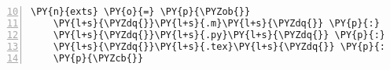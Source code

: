 \begin{Verbatim}[commandchars=\\\{\},numbers=left,numbersep=0.5em,firstnumber=10]
  \PY{n}{exts} \PY{o}{=} \PY{p}{\PYZob{}}
    \PY{l+s}{\PYZdq{}}\PY{l+s}{.m}\PY{l+s}{\PYZdq{}} \PY{p}{:} \PY{l+s}{\PYZdq{}}\PY{l+s}{\PYZpc{}}\PY{l+s}{\PYZdl{}}\PY{l+s}{\PYZdq{}}\PY{p}{,} 
    \PY{l+s}{\PYZdq{}}\PY{l+s}{.py}\PY{l+s}{\PYZdq{}} \PY{p}{:} \PY{l+s}{\PYZdq{}}\PY{l+s}{\PYZsh{}\PYZdl{}}\PY{l+s}{\PYZdq{}}\PY{p}{,}
    \PY{l+s}{\PYZdq{}}\PY{l+s}{.tex}\PY{l+s}{\PYZdq{}} \PY{p}{:} \PY{l+s}{\PYZdq{}}\PY{l+s}{\PYZpc{}}\PY{l+s}{\PYZdl{}}\PY{l+s}{\PYZdq{}}\PY{p}{,}
    \PY{p}{\PYZcb{}}
\end{Verbatim}
